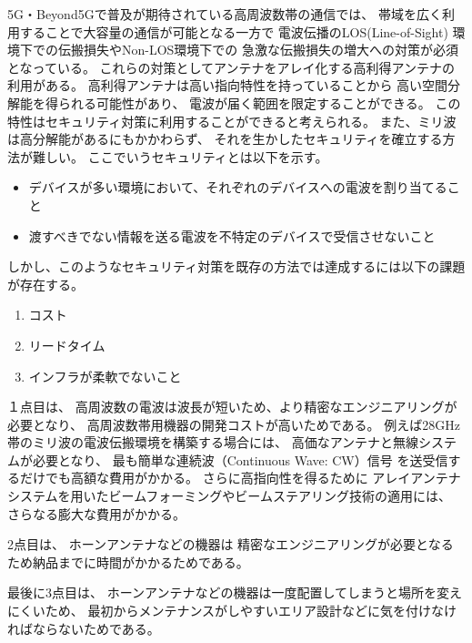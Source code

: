 \documentclass[technicalreport]{ieicej}
\begin{document}
5G・Beyond5Gで普及が期待されている高周波数帯の通信では、
帯域を広く利用することで大容量の通信が可能となる一方で
電波伝播のLOS(Line-of-Sight)
環境下での伝搬損失やNon-LOS環境下での
急激な伝搬損失の増大への対策が必須となっている。
これらの対策としてアンテナをアレイ化する高利得アンテナの利用がある。
高利得アンテナは高い指向特性を持っていることから
高い空間分解能を得られる可能性があり、
電波が届く範囲を限定することができる。
この特性はセキュリティ対策に利用することができると考えられる。
また、ミリ波は高分解能があるにもかかわらず、
それを生かしたセキュリティを確立する方法が難しい。
ここでいうセキュリティとは以下を示す。

\begin{itemize}
  \item デバイスが多い環境において、それぞれのデバイスへの電波を割り当てること
  \item 渡すべきでない情報を送る電波を不特定のデバイスで受信させないこと
\end{itemize}

しかし、このようなセキュリティ対策を既存の方法では達成するには以下の課題が存在する。

\begin{enumerate}
  \item コスト
  \item リードタイム
  \item インフラが柔軟でないこと
\end{enumerate}

１点目は、
高周波数の電波は波長が短いため、より精密なエンジニアリングが必要となり、
高周波数帯用機器の開発コストが高いためである。
例えば28GHz帯のミリ波の電波伝搬環境を構築する場合には、
高価なアンテナと無線システムが必要となり、
最も簡単な連続波（Continuous Wave: CW）信号
を送受信するだけでも高額な費用がかかる\cite{zep}。
さらに高指向性を得るために
アレイアンテナシステムを用いたビームフォーミングやビームステアリング技術の適用には、
さらなる膨大な費用がかかる。

2点目は、
ホーンアンテナなどの機器は
精密なエンジニアリングが必要となるため納品までに時間がかかるためである。

最後に3点目は、
ホーンアンテナなどの機器は一度配置してしまうと場所を変えにくいため、
最初からメンテナンスがしやすいエリア設計などに気を付けなければならないためである。
\end{document}

